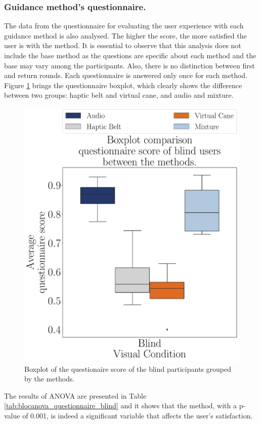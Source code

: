 \subsubsection{Guidance method's questionnaire.}
\label{subsubsec:results_questionnaires}

The data from the questionnaire for evaluating the user experience with each guidance method is also analysed. The higher the score, the more satisfied the user is with the method. It is essential to observe that this analysis does not include the base method as the questions are specific about each method and the base may vary among the participants. Also, there is no distinction between first and return rounds. Each questionnaire is answered only once for each method.
Figure \ref{fig:boxplot_quest_blind_scene} brings the questionnaire boxplot, which clearly shows the difference between two groups: haptic belt and virtual cane, and audio and mixture. 

\begin{figure}[!htb]
    \centering
    \includegraphics[width = 0.75\linewidth]{3 - Resultados/Figuras/boxplot_questionnaire_scene_blind.pdf}
    \caption{Boxplot of the questionaire score of the blind participants grouped by the methods.}
    \label{fig:boxplot_quest_blind_scene}
\end{figure}

The results of ANOVA are presented in Table  \ref{tab:blocanova_questionnaire_blind} and it shows that the method, with a p-value of 0.001, is indeed a significant variable that affects the user's satisfaction.

